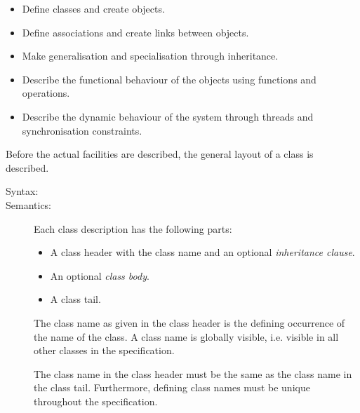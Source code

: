 \documentclass[\pformat,12pt]{article}
\begin{document}
\begin{itemize}
\item Define classes and create objects.
\item Define associations and create links between objects.
\item Make generalisation and specialisation through inheritance.
\item Describe the functional behaviour of the objects using functions
  and operations.
\item Describe the dynamic behaviour of the system through threads and
  synchronisation constraints.
\end{itemize}

Before the actual facilities are described, the general layout of a
class is described.

\begin{description}
\item[Syntax:] 

\item[Semantics:] Each class description has the following parts:
\begin{itemize}
\item A class header with the class name and an optional
  {\em inheritance clause}.
\item An optional {\em class body}.
\item A class tail.
\end{itemize}

The class name as given in the class header is the defining occurrence
of the name of the class. A class name is globally visible, i.e. visible
in all other classes in the specification.

The class name in the class header must be the same as the class
name in the class tail.  Furthermore, defining class names must be unique
throughout the specification.


\end{description}
\end{document}
